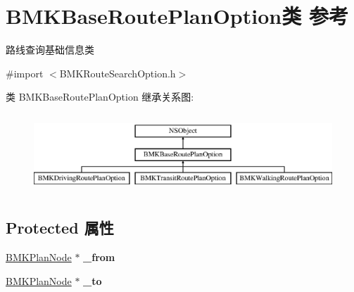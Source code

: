 \hypertarget{interface_b_m_k_base_route_plan_option}{\section{B\+M\+K\+Base\+Route\+Plan\+Option类 参考}
\label{interface_b_m_k_base_route_plan_option}
}


路线查询基础信息类  




{\ttfamily \#import $<$B\+M\+K\+Route\+Search\+Option.\+h$>$}

类 B\+M\+K\+Base\+Route\+Plan\+Option 继承关系图\+:\begin{figure}[H]
\begin{center}
\leavevmode
\includegraphics[height=3.000000cm]{interface_b_m_k_base_route_plan_option}
\end{center}
\end{figure}
\subsection*{Protected 属性}
\begin{DoxyCompactItemize}
\item 
\hypertarget{interface_b_m_k_base_route_plan_option_a1a668d22cbdfdf6f4b619522a5c24482}{\hyperlink{interface_b_m_k_plan_node}{B\+M\+K\+Plan\+Node} $\ast$ {\bfseries \+\_\+from}}\label{interface_b_m_k_base_route_plan_option_a1a668d22cbdfdf6f4b619522a5c24482}

\item 
\hypertarget{interface_b_m_k_base_route_plan_option_a57edc8a986cecead42fef9e55949157c}{\hyperlink{interface_b_m_k_plan_node}{B\+M\+K\+Plan\+Node} $\ast$ {\bfseries \+\_\+to}}\label{interface_b_m_k_base_route_plan_option_a57edc8a986cecead42fef9e55949157c}

\end{DoxyCompactItemize}
